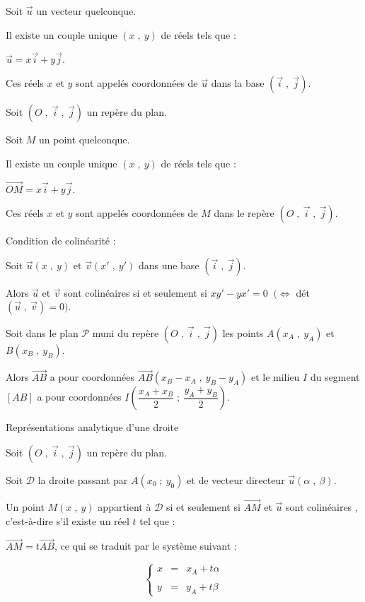 \documentclass{article}
\begin{document}
		Soit $\vec{u}$ un vecteur quelconque.
		
		Il existe un couple unique $(x\;,\ y)$ de réels tels que :
		
		$\vec{u}=x\vec{i}+y\vec{j}.$
		
		Ces réels $x$ et $y$ sont appelés coordonnées de $\vec{u}$ dans la base $(\vec{i}\;,\ \vec{j}).$
		
		Soit $(O\;,\ \vec{i}\;,\ \vec{j})$ un repère du plan.
		
		Soit $M$ un point quelconque.
		
		Il existe un couple unique $(x\;,\ y)$ de réels tels que :
		
		$\overrightarrow{OM}=x\vec{i}+y\vec{j}.$
		
		Ces réels $x$ et $y$ sont appelés coordonnées de $M$ dans le repère $(O\;,\ \vec{i}\;,\ \vec{j}).$
		
		
		Condition de colinéarité :
		
		Soit $\vec{u}(x\;,\ y)$ et $\vec{v}(x'\;,\ y')$ dans une base $(\vec{i}\;,\ \vec{j}).$
		
		Alors $\vec{u}$ et $\vec{v}$ sont colinéaires si et seulement si $xy'-yx'=0$ $\ (\Leftrightarrow$ dét$(\vec{u}\;,\ \vec{v})=0).$
		
		Soit dans le plan $\mathcal{P}$ muni du repère $(O\;,\ \vec{i}\;,\ \vec{j})$ les points $A\left(x_{A}\;,\ y_{A}\right)$ et $B\left(x_{B}\;,\ y_{B}\right).$
		
		Alors $\overrightarrow{AB}$ a pour coordonnées $\overrightarrow{AB}\left(x_{B}-x_{A}\;,\ y_{B}-y_{A}\right)$ et le milieu $I$ du segment $[AB]$ a pour coordonnées $I\left(\dfrac{x_{A}+x_{B}}{2}\;;\ \dfrac{y_{A}+y_{B}}{2}\right).$
		
		Représentations analytique d'une droite
		
		Soit $(O\;,\ \vec{i}\;,\ \vec{j})$ un repère du plan.
		
		Soit $\mathcal{D}$ la droite passant par $A(x_{0}\;;\ y_{0})$ et de vecteur directeur $\overrightarrow{u}(\alpha\;,\ \beta).$
		
		Un point $M(x\;,\ y)$ appartient à $\mathcal{D}$ si et seulement si $\overrightarrow{AM}$ et $\overrightarrow{u}$ sont colinéaires , c'est-à-dire s'il existe un réel $t$ tel que : 
		
		$\overrightarrow{AM}=t\overrightarrow{AB}$, ce qui se traduit par le système suivant :
		
		$$\left\lbrace\begin{array}{lcl} x& =& x_{A}+t\alpha\\ \\ y& =& y_{A}+t\beta \end{array}\right.$$
		
\end{document}
